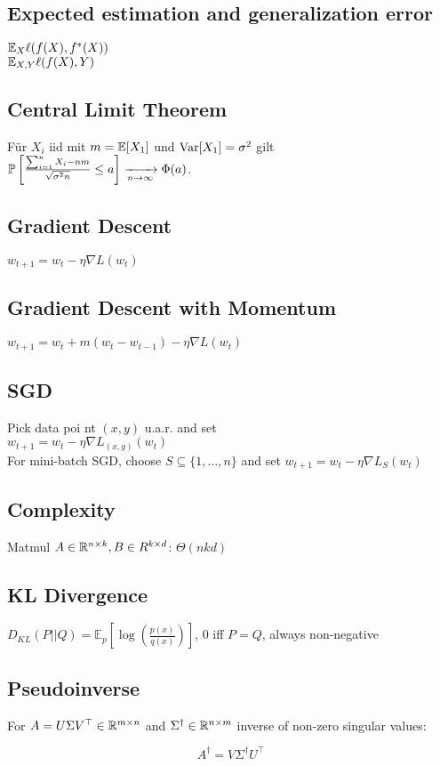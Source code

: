\subsection*{Expected estimation and generalization error}
$\E_{X}\ell(f(X), f^\ast(X))$ \\ 
$\E_{X,Y}\ell(f(X), Y)$

\subsection*{Central Limit Theorem}

Für $X_i$ iid mit $m = \E[X_1]$ und $\Var[X_1] = \sigma^2$ gilt $\P\left[\frac{\sum_{i=1}^n X_i - n m}{\sqrt{\sigma^2 n}} \leq a\right] \xrightarrow[n \to \infty]{} \Phi(a)$.

\subsection*{Gradient Descent}
$w_{t+1} = w_t - \eta \nabla L(w_t)$
\subsection*{Gradient Descent with Momentum} $w_{t+1}=w_t+m(w_t-w_{t-1})-\eta \nabla L(w_t)$
\subsection*{SGD}
Pick data poi nt $(x,y)$ u.a.r. and set\\  $w_{t+1} = w_t - \eta \nabla L_{(x,y)}(w_t)$ \\ For mini-batch SGD, choose $S \subseteq \{1, \ldots, n\}$ and set $w_{t+1} = w_t - \eta \nabla L_{S}(w_t)$
\subsection*{Complexity}
Matmul $A\in\R^{n\times k},B\in R^{k\times d}$: $\Theta(n k d)$

\subsection*{KL Divergence}
$D_{KL}(P||Q) = \mathbb{E}_p[\log(\frac{p(x)}{q(x)})]$, 0 iff $P = Q$, always non-negative
\\

\subsection*{Pseudoinverse}

For $A = U \Sigma V^\top \in \R^{m \times n}$ and $\Sigma^\dagger \in \R^{n \times m}$ inverse of non-zero singular values:

$$
A^\dagger = V \Sigma^\dagger U^\top
$$
